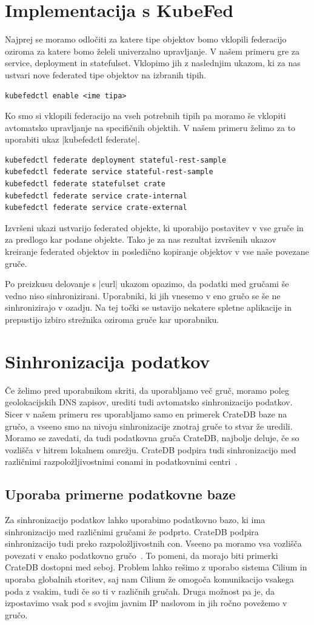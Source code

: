 \documentclass[a4paper, 12pt]{book}
\begin{document}
\section{Implementacija s KubeFed}
Najprej se moramo odločiti za katere tipe objektov bomo vklopili federacijo oziroma za katere bomo želeli univerzalno upravljanje.
V našem primeru gre za service, deployment in statefulset.
Vklopimo jih z naslednjim ukazom, ki za nas ustvari nove federated tipe objektov na izbranih tipih.
\begin{verbatim}
kubefedctl enable <ime tipa>
\end{verbatim}
Ko smo si vklopili federacijo na vseh potrebnih tipih pa moramo še vklopiti avtomatsko upravljanje na specifičnih objektih.
V našem primeru želimo za to uporabiti ukaz \spverb|kubefedctl federate|.
\begin{verbatim}
kubefedctl federate deployment stateful-rest-sample
kubefedctl federate service stateful-rest-sample
kubefedctl federate statefulset crate
kubefedctl federate service crate-internal
kubefedctl federate service crate-external
\end{verbatim}
Izvršeni ukazi ustvarijo federated objekte, ki uporabijo postavitev v vse gruče in za predlogo kar podane objekte.
Tako je za nas rezultat izvršenih ukazov kreiranje federated objektov in posledično kopiranje objektov v vse naše povezane gruče.

Po preizkusu delovanje s \spverb|curl| ukazom opazimo, da podatki med gručami še vedno niso sinhronizirani.
Uporabniki, ki jih vnesemo v eno gručo se še ne sinhronizirajo v ozadju.
Na tej točki se ustavijo nekatere spletne aplikacije in prepustijo izbiro strežnika oziroma gruče kar uporabniku.
\section{Sinhronizacija podatkov}
Če želimo pred uporabnikom skriti, da uporabljamo več gruč, moramo poleg geolokacijskih DNS zapisov, urediti tudi avtomatsko sinhronizacijo podatkov.
Sicer v našem primeru res uporabljamo samo en primerek CrateDB baze na gručo, a vseeno smo na nivoju sinhronizacije znotraj gruče to stvar že uredili. 
Moramo se zavedati, da tudi podatkovna gruča CrateDB, najbolje deluje, če so vozlišča v hitrem lokalnem omrežju.
CrateDB podpira tudi sinhronizacijo med različnimi razpoložljivostnimi conami in podatkovnimi centri~\cite{cratedb-zone}.
\subsection{Uporaba primerne podatkovne baze}
Za sinhronizacijo podatkov lahko uporabimo podatkovno bazo, ki ima sinhronizacijo med različnimi gručami že podprto.
CrateDB podpira sinhronizacijo tudi preko razpoložljivostnih con.
Vseeno pa moramo vsa vozlišča povezati v enako podatkovno gručo~\cite{cratedb-zone}.
To pomeni, da morajo biti primerki CrateDB dostopni med seboj.
Problem lahko rešimo z uporabo sistema Cilium in uporaba globalnih storitev, saj nam Cilium že omogoča komunikacijo vsakega poda z vsakim, tudi če so ti v različnih gručah.
Druga možnost pa je, da izpostavimo vsak pod s svojim javnim IP naslovom in jih ročno povežemo v gručo.
\end{document}
